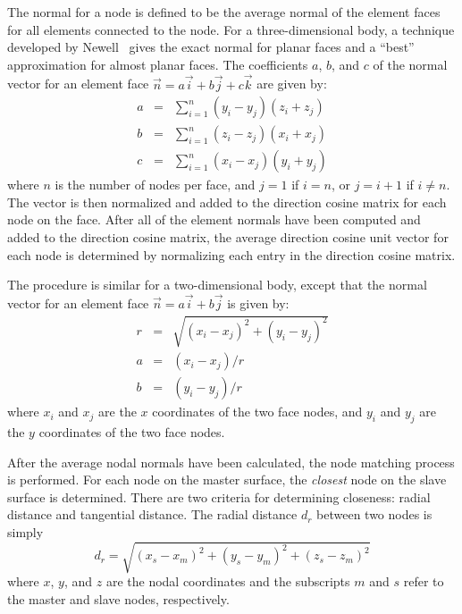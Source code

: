 The normal for a node is defined to be the average normal of the element
faces for all elements connected to the node.  For a three-dimensional
body, a technique developed by Newell~\cite{Rogers:pefcg} gives the
exact normal for planar faces and a ``best'' approximation for almost
planar faces. The coefficients $a$, $b$, and $c$ of the normal vector
for an element face $\vec{n} = a\vec{i} + b\vec{j} + c\vec{k}$ are given by: 
\begin{eqnarray}
a &=& \sum_{i=1}^n (y_i - y_j)(z_i + z_j) \nonumber\\
b &=& \sum_{i=1}^n (z_i - z_j)(x_i + x_j) \label{3dnorm}\\
c &=& \sum_{i=1}^n (x_i - x_j)(y_i + y_j) \nonumber
\end{eqnarray}
where $n$ is the number of nodes per face, and $j = 1$ if $i=n$, or
$j=i+1$ if $i\ne n$.  The vector is then normalized and added to the
direction cosine matrix for each node on the face.  After all of the
element normals have been computed and added to the direction cosine
matrix, the average direction cosine unit vector for each node is
determined by normalizing each entry in the direction cosine matrix.

The procedure is similar for a two-dimensional body, except that the
normal vector for an element face $\vec{n} = a\vec{i} + b\vec{j}$ is given by:
\begin{eqnarray}
      r &=& \sqrt{(x_i - x_j)^2 + (y_i - y_j)^2} \nonumber \\
      a &=& (x_i - x_j) / r                      \label{2dnorm}\\
      b &=& (y_i - y_j) / r                      \nonumber
\end{eqnarray}
where $x_i$ and $x_j$ are the $x$ coordinates of the two face nodes, and
$y_i$ and $y_j$ are the $y$ coordinates of the two face nodes. 

After the average nodal normals have been calculated, the node matching
process is performed.  For each node on the master surface, the {\em
closest} node on the slave surface is determined.  There are two
criteria for determining closeness: radial distance and tangential
distance.  The radial distance $d_r$ between two nodes is simply 
\begin{equation}
d_r = \sqrt{(x_s - x_m)^2 + (y_s - y_m)^2 + (z_s - z_m)^2}\label{distr}
\end{equation}
where $x$, $y$, and $z$ are the nodal coordinates and the subscripts $m$
and $s$ refer to the master and slave nodes, respectively.

